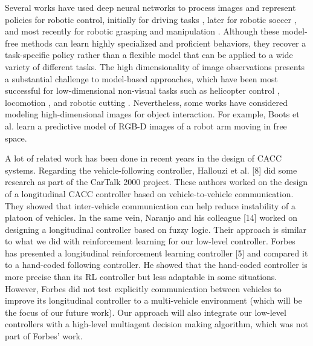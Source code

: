 Several works have used deep neural networks to process images and represent policies for robotic control, initially for driving tasks \cite{AutonomousLand1989} \cite{LongrangeVision2009}, later for robotic soccer \cite{RobotSoccer2009}, and most recently for robotic grasping \cite{Grasp2016} \cite{RooticGrasping2016} and manipulation \cite{Visuomotor2016}. Although these model-free methods can learn highly specialized and proficient behaviors, they recover a task-specific policy rather than a flexible model that can be applied to a wide variety of different tasks. The high dimensionality of image observations presents a substantial challenge to model-based approaches, which have been most successful for low-dimensional non-visual tasks \cite{PolicySearch2011} such as helicopter control \cite{HeliNg2007}, locomotion \cite{Trajectory2012}, and robotic cutting \cite{Deepmpc2015}. Nevertheless, some works have considered modeling high-dimensional images for object interaction. For example, Boots et al. \cite{Predictive2014} learn a predictive model of RGB-D images of a robot arm moving in free space.


A lot of related work has been done in recent years in the design of CACC systems. Regarding the vehicle-following controller, Hallouzi et al. [8] did some research as part of the CarTalk 2000 project. These authors worked on the design of a longitudinal CACC controller based on vehicle-to-vehicle communication. They showed that inter-vehicle communication can help reduce instability of a platoon of vehicles. In the same vein, Naranjo and his colleague [14] worked on designing a longitudinal controller based on fuzzy logic. Their approach is similar to what we did with reinforcement learning for our low-level controller. Forbes has presented a longitudinal reinforcement learning controller [5] and compared it to a hand-coded following controller. He showed that the hand-coded controller is more precise than its RL controller but less adaptable in some situations. However, Forbes did not test explicitly communication between vehicles to improve its longitudinal controller to a multi-vehicle environment (which will be the focus of our future work). Our approach will also integrate our low-level controllers with a high-level multiagent decision making algorithm, which was not part of Forbes' work.


